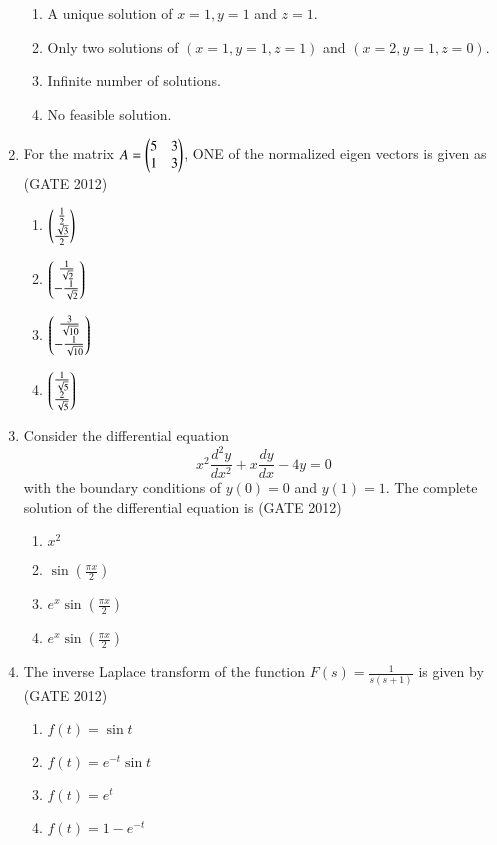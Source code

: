 \documentclass[journal,12pt,onecolumn]{IEEEtran}
\theoremstyle{remark}
\begin{document}
\begin{enumerate}
\begin{enumerate}
\item A unique solution of $x=1, y=1$ and $z=1$.
\item Only two solutions of $(x=1, y=1, z=1)$ and $(x=2, y=1, z=0)$.
\item Infinite number of solutions.
\item No feasible solution.
\end{enumerate}

\vspace{1cm}
\item  For the matrix $A=\begin{pmatrix}5 & 3 \\ 1 & 3\end{pmatrix}$, ONE of the normalized eigen vectors is given as
\hfill{(GATE 2012)}

\begin{enumerate}
\item $\begin{pmatrix}\tfrac{1}{2} \\ \tfrac{\sqrt{3}}{2}\end{pmatrix}$
\item $\begin{pmatrix}\tfrac{1}{\sqrt{2}} \\ -\tfrac{1}{\sqrt{2}}\end{pmatrix}$
\item $\begin{pmatrix}\tfrac{3}{\sqrt{10}} \\ -\tfrac{1}{\sqrt{10}}\end{pmatrix}$
\item $\begin{pmatrix}\tfrac{1}{\sqrt{5}} \\ \tfrac{2}{\sqrt{5}}\end{pmatrix}$
\end{enumerate}

\vspace{1cm}
\item  Consider the differential equation 
\[
x^2 \frac{d^2 y}{dx^2} + x \frac{dy}{dx} - 4y = 0
\]
with the boundary conditions of $y(0)=0$ and $y(1)=1$. The complete solution of the differential equation is
\hfill{(GATE 2012)}

\begin{enumerate}
\item $x^2$
\item $\sin\left(\tfrac{\pi x}{2}\right)$
\item $e^x \sin\left(\tfrac{\pi x}{2}\right)$
\item $e^x \sin\left(\tfrac{\pi x}{2}\right)$
\end{enumerate}

\vspace{1cm}
\item  The inverse Laplace transform of the function $F(s)=\tfrac{1}{s(s+1)}$ is given by
\hfill{(GATE 2012)}

\begin{enumerate}
\item $f(t) = \sin t$
\item $f(t) = e^{-t} \sin t$
\item $f(t) = e^t$
\item $f(t) = 1 - e^{-t}$
\end{enumerate}


\end{enumerate}
\end{document}
